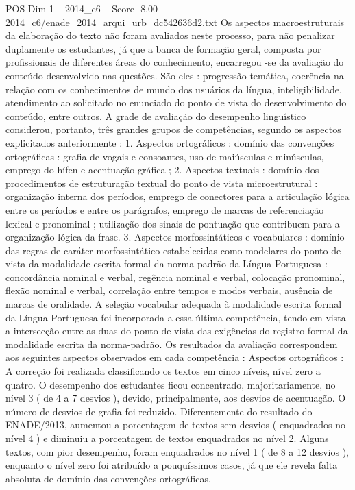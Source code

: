 \begin{textsample}{POS Dim 1 – 2014\_c6 – Score -8.00 – 2014\_c6/enade\_2014\_arqui\_urb\_dc542636d2.txt}
Os aspectos macroestruturais da elaboração do texto não foram avaliados neste processo, para não penalizar duplamente os estudantes, já que a banca de formação geral, composta por profissionais de diferentes áreas do conhecimento, encarregou -se da avaliação do conteúdo desenvolvido nas questões.
São eles : progressão temática, coerência na relação com os conhecimentos de mundo dos usuários da língua, inteligibilidade, atendimento ao solicitado no enunciado do ponto de vista do desenvolvimento do conteúdo, entre outros.
A grade de avaliação do desempenho linguístico considerou, portanto, três grandes grupos de competências, segundo os aspectos explicitados anteriormente : 1.
Aspectos ortográficos : domínio das convenções ortográficas : grafia de vogais e consoantes, uso de maiúsculas e minúsculas, emprego do hífen e acentuação gráfica ; 2.
Aspectos textuais : domínio dos procedimentos de estruturação textual do ponto de vista microestrutural : organização interna dos períodos, emprego de conectores para a articulação lógica entre os períodos e entre os parágrafos, emprego de marcas de referenciação lexical e pronominal ; utilização dos sinais de pontuação que contribuem para a organização lógica da frase. 3.
Aspectos morfossintáticos e vocabulares : domínio das regras de caráter morfossintático estabelecidas como modelares do ponto de vista da modalidade escrita formal da norma-padrão da Língua Portuguesa : concordância nominal e verbal, regência nominal e verbal, colocação pronominal, flexão nominal e verbal, correlação entre tempos e modos verbais, ausência de marcas de oralidade.
A seleção vocabular adequada à modalidade escrita formal da Língua Portuguesa foi incorporada a essa última competência, tendo em vista a intersecção entre as duas do ponto de vista das exigências do registro formal da modalidade escrita da norma-padrão.
Os resultados da avaliação correspondem aos seguintes aspectos observados em cada competência : Aspectos ortográficos : A correção foi realizada classificando os textos em cinco níveis, nível zero a quatro.
O desempenho dos estudantes ficou concentrado, majoritariamente, no nível 3 ( de 4 a 7 desvios ), devido, principalmente, aos desvios de acentuação.
O número de desvios de grafia foi reduzido.
Diferentemente do resultado do ENADE/2013, aumentou a porcentagem de textos sem desvios ( enquadrados no nível 4 ) e diminuiu a porcentagem de textos enquadrados no nível 2.
Alguns textos, com pior desempenho, foram enquadrados no nível 1 ( de 8 a 12 desvios ), enquanto o nível zero foi atribuído a pouquíssimos casos, já que ele revela falta absoluta de domínio das convenções ortográficas.

\end{textsample}
